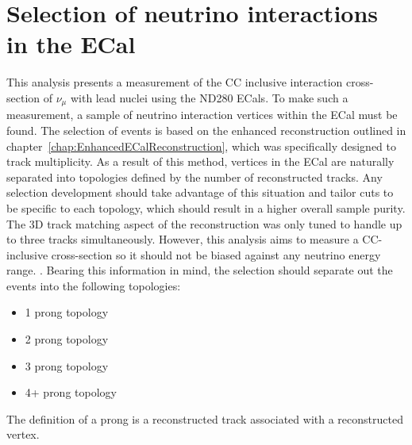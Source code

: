 \chapter{Selection of neutrino interactions in the ECal}
\label{chap:NeutrinoInteractionSelection}
This analysis presents a measurement of the CC inclusive interaction cross-section of $\nu_\mu$ with lead nuclei using the ND280  ECals.  To make such a measurement, a sample of neutrino interaction vertices within the ECal must be found.  The selection of events is based on the enhanced reconstruction outlined in chapter~\ref{chap:EnhancedECalReconstruction}, which was specifically designed to  track multiplicity.  As a result of this method, vertices in the ECal are naturally separated into topologies defined by the number of reconstructed tracks.  Any selection development should take advantage of this situation and tailor cuts to be specific to each topology, which should result in a higher overall sample purity.  The 3D track matching aspect of the reconstruction was only tuned to handle up to three tracks simultaneously.  However, this analysis aims to measure a CC-inclusive cross-section so it should not be biased against any neutrino energy range.  .  Bearing this information in mind, the selection should separate out the events into the following topologies:
\begin{itemize}
  \item 1 prong topology
  \item 2 prong topology
  \item 3 prong topology
  \item 4+ prong topology
\end{itemize}
The definition of a prong is a reconstructed track associated with a reconstructed vertex.
\newline
